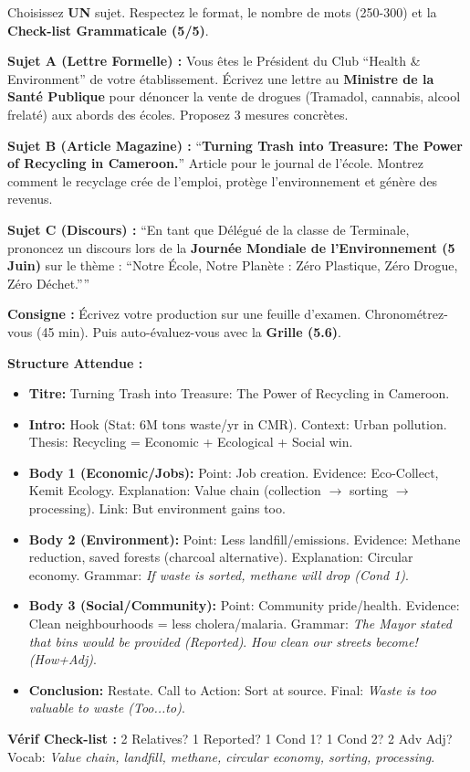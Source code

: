 \documentclass[11pt]{article}
\begin{document}
\begin{exercice}
Choisissez \textbf{UN} sujet. Respectez le format, le nombre de mots (250-300) et la \textbf{Check-list Grammaticale (5/5)}.

\textbf{Sujet A (Lettre Formelle) :} Vous êtes le Président du Club ``Health \& Environment'' de votre établissement. Écrivez une lettre au \textbf{Ministre de la Santé Publique} pour dénoncer la vente de drogues (Tramadol, cannabis, alcool frelaté) aux abords des écoles. Proposez 3 mesures concrètes.

\textbf{Sujet B (Article Magazine) :} ``\textbf{Turning Trash into Treasure: The Power of Recycling in Cameroon.}'' Article pour le journal de l'école. Montrez comment le recyclage crée de l'emploi, protège l'environnement et génère des revenus.

\textbf{Sujet C (Discours) :} ``En tant que Délégué de la classe de Terminale, prononcez un discours lors de la \textbf{Journée Mondiale de l'Environnement (5 Juin)} sur le thème : ``Notre École, Notre Planète : Zéro Plastique, Zéro Drogue, Zéro Déchet.''''

\textbf{Consigne :} Écrivez votre production sur une feuille d'examen. Chronométrez-vous (45 min). Puis auto-évaluez-vous avec la \textbf{Grille (5.6)}.
\end{exercice}

\begin{corrige}
\textbf{Structure Attendue :}
\begin{itemize}
    \item \textbf{Titre:} Turning Trash into Treasure: The Power of Recycling in Cameroon.
    \item \textbf{Intro:} Hook (Stat: 6M tons waste/yr in CMR). Context: Urban pollution. Thesis: Recycling = Economic + Ecological + Social win.
    \item \textbf{Body 1 (Economic/Jobs):} Point: Job creation. Evidence: Eco-Collect, Kemit Ecology. Explanation: Value chain (collection $\rightarrow$ sorting $\rightarrow$ processing). Link: But environment gains too.
    \item \textbf{Body 2 (Environment):} Point: Less landfill/emissions. Evidence: Methane reduction, saved forests (charcoal alternative). Explanation: Circular economy. Grammar: \textit{If waste is sorted, methane will drop (Cond 1)}.
    \item \textbf{Body 3 (Social/Community):} Point: Community pride/health. Evidence: Clean neighbourhoods = less cholera/malaria. Grammar: \textit{The Mayor stated that bins would be provided (Reported)}. \textit{How clean our streets become! (How+Adj)}.
    \item \textbf{Conclusion:} Restate. Call to Action: Sort at source. Final: \textit{Waste is too valuable to waste (Too...to)}.
\end{itemize}
\textbf{Vérif Check-list :} 2 Relatives? 1 Reported? 1 Cond 1? 1 Cond 2? 2 Adv Adj? Vocab: \textit{Value chain, landfill, methane, circular economy, sorting, processing}.
\end{corrige}
\end{document}
